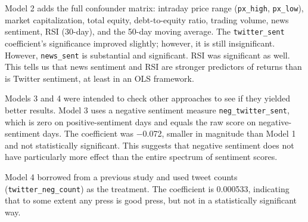 \documentclass[12pt]{article}
\begin{document}
Model 2 adds the full confounder matrix: intraday price range (\texttt{px\_high}, \texttt{px\_low}), market capitalization, total equity, debt-to-equity ratio, trading volume, news sentiment, RSI (30-day), and the 50-day moving average. The \texttt{twitter\_sent} coefficient's significance improved slightly; however, it is still insignificant. However, \texttt{news\_sent} is substantial and significant. RSI was significant as well. This tells us that news sentiment and RSI are stronger predictors of returns than is Twitter sentiment, at least in an OLS framework.

Models 3 and 4 were intended to check other approaches to see if they yielded better results. Model 3 uses a negative sentiment measure \texttt{neg\_twitter\_sent}, which is zero on positive-sentiment days and equals the raw score on negative-sentiment days. The coefficient was $-$0.072, smaller in magnitude than Model 1 and not statistically significant. This suggests that negative sentiment does not have particularly more effect than the entire spectrum of sentiment scores.

Model 4 borrowed from a previous study and used tweet counts (\texttt{twitter\_neg\_count}) as the treatment. The coefficient is 0.000533, indicating that to some extent any press is good press, but not in a statistically significant way.
\end{document}
